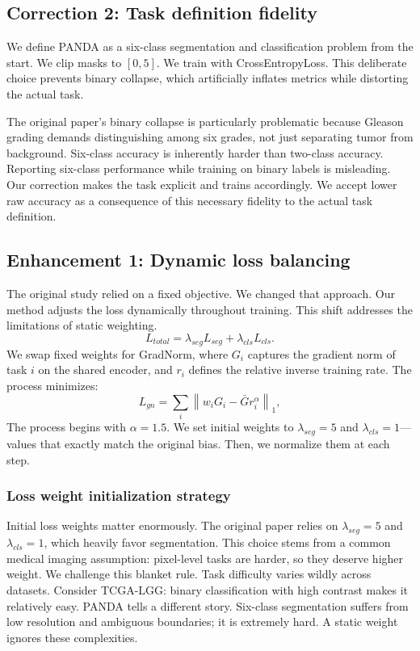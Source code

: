 \documentclass[conference,a4paper]{IEEEtran}
\begin{document}
\subsection{Correction 2: Task definition fidelity}
We define PANDA as a six-class segmentation and classification problem from the start. We clip masks to $[0,5]$. We train with CrossEntropyLoss. This deliberate choice prevents binary collapse, which artificially inflates metrics while distorting the actual task.

The original paper’s binary collapse is particularly problematic because Gleason grading demands distinguishing among six grades, not just separating tumor from background. Six-class accuracy is inherently harder than two-class accuracy. Reporting six-class performance while training on binary labels is misleading. Our correction makes the task explicit and trains accordingly. We accept lower raw accuracy as a consequence of this necessary fidelity to the actual task definition.

\subsection{Enhancement 1: Dynamic loss balancing}
The original study relied on a fixed objective.
We changed that approach.
Our method adjusts the loss dynamically throughout training.
This shift addresses the limitations of static weighting.
\begin{equation}
L_{total} = \lambda_{seg} L_{seg} + \lambda_{cls} L_{cls}.
\end{equation}
We swap fixed weights for GradNorm, where $G_i$ captures the gradient norm of task $i$ on the shared encoder, and $r_i$ defines the relative inverse training rate. The process minimizes:
\begin{equation}
L_{gn} = \sum_i \left\lVert w_i G_i - \bar{G} r_i^{\alpha} \right\rVert_1,
\end{equation}
The process begins with $\alpha=1.5$. We set initial weights to $\lambda_{seg}=5$ and $\lambda_{cls}=1$—values that exactly match the original bias. Then, we normalize them at each step.

\subsubsection{Loss weight initialization strategy}
Initial loss weights matter enormously. The original paper relies on $\lambda_{seg}=5$ and $\lambda_{cls}=1$, which heavily favor segmentation. This choice stems from a common medical imaging assumption: pixel-level tasks are harder, so they deserve higher weight. We challenge this blanket rule. Task difficulty varies wildly across datasets. Consider TCGA-LGG: binary classification with high contrast makes it relatively easy. PANDA tells a different story. Six-class segmentation suffers from low resolution and ambiguous boundaries; it is extremely hard. A static weight ignores these complexities.
\end{document}
